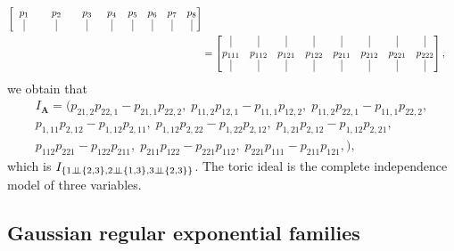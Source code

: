 \begin{eg}
\begin{align*}
\begin{bmatrix}
      \hspace{2mm}p_{1}\hspace{2mm} & \hspace{2mm}p_{2}\hspace{2mm} & p_{3} & p_{4} & p_{5} & p_{6} & p_{7} & p_{8} \\
      \hspace{2mm} \vline\hspace{2mm}  & \hspace{4mm}\vline\hspace{4mm} & \hspace{3mm}\vline\hspace{3mm} & \hspace{2mm}\vline\hspace{2mm} & \vline & \vline & \vline & \vline 
    \end{bmatrix} \\
    &=
    \begin{bmatrix}
      \vline & \vline & \vline & \vline & \vline & \vline & \vline & \vline \\
      p_{111} & p_{112} & p_{121} & p_{122} & p_{211} & p_{212} & p_{221} & p_{222} \\
      \vline  & \vline & \vline & \vline & \vline & \vline & \vline & \vline 
    \end{bmatrix},
  \end{align*}
  we obtain that 
  \begin{gather*}
    I_\mathbf A = ( 
      p_{21,2}p_{22,1} - p_{21,1}p_{22,2}, \; 
      p_{11,2}p_{12,1} - p_{11,1}p_{12,2},   \;
      p_{11,2}p_{22,1} - p_{11,1}p_{22,2},  \\
      p_{1,11}p_{2,12} - p_{1,12}p_{2,11}, \; 
      p_{1,12}p_{2,22} - p_{1,22}p_{2,12},   \;
      p_{1,21}p_{2,12} - p_{1,12}p_{2,21}, \\
      p_{112}p_{221} - p_{122}p_{211}, \; 
      p_{211}p_{122} - p_{221}p_{112},   \;
      p_{221}p_{111} - p_{211}p_{121},
    ),
  \end{gather*}
  which is \( I_{\{1 \indep \left\{ 2,3 \right\}, 2 \indep \left\{ 1,3 \right\}, 3 \indep \left\{ 2,3 \right\}\}} \). The toric ideal is the complete independence model of three variables.
\end{eg}

\subsection{Gaussian regular exponential families}

